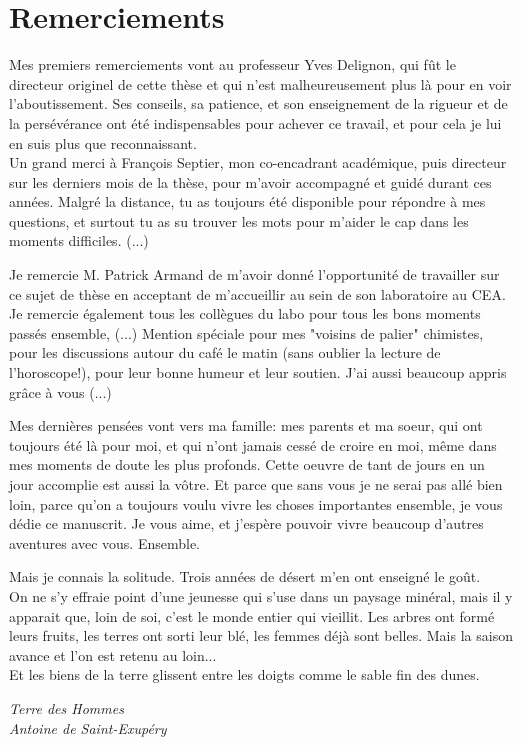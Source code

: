 \section*{Remerciements}

Mes premiers remerciements vont au professeur Yves Delignon, qui fût le directeur originel de cette thèse et qui n'est malheureusement plus là pour en voir l'aboutissement. Ses conseils, sa patience, et son enseignement de la rigueur et de la persévérance ont été indispensables pour achever ce travail, et pour cela je lui en suis plus que reconnaissant. \\

Un grand merci à François Septier, mon co-encadrant académique, puis directeur sur les derniers mois de la thèse, pour m'avoir accompagné et guidé durant ces années. Malgré la distance, tu as toujours été disponible pour répondre à mes questions, et surtout tu as su trouver les mots pour m'aider le cap dans les moments difficiles. (...)

Je remercie M. Patrick Armand de m'avoir donné l'opportunité de travailler sur ce sujet de thèse en acceptant de m'accueillir au sein de son laboratoire au CEA. Je remercie également tous les collègues du labo pour tous les bons moments passés ensemble,  (...) Mention spéciale pour mes "voisins de palier" chimistes, pour les discussions autour du café le matin (sans oublier la lecture de l'horoscope!), pour leur bonne humeur et leur soutien. J'ai aussi beaucoup appris grâce à vous (...)



Mes dernières pensées vont vers ma famille: mes parents et ma soeur, qui ont toujours été là pour moi, et qui n'ont jamais cessé de croire en moi, même dans mes moments de doute les plus profonds. Cette oeuvre de tant de jours en un jour accomplie est aussi la vôtre. Et parce que sans vous je ne serai pas allé bien loin, parce qu'on a toujours voulu vivre les choses importantes ensemble, je vous dédie ce manuscrit. Je vous aime, et j'espère pouvoir vivre beaucoup d'autres aventures avec vous. Ensemble. 

\newpage

\setlength{\epigraphwidth}{0.8\textwidth}
\epigraph{Mais je connais la solitude. Trois années de désert m'en ont enseigné le goût. \\
	
	On ne s'y effraie point d'une jeunesse qui s'use dans un paysage minéral, mais il y apparait que, loin de soi, c'est le monde entier qui vieillit. Les arbres ont formé leurs fruits, les terres ont sorti leur blé, les femmes déjà sont belles. Mais la saison avance et l'on est retenu au loin... \\
	
	Et les biens de la terre glissent entre les doigts comme le sable fin des dunes.}{\textit{Terre des Hommes\\ Antoine de Saint-Exupéry}}
